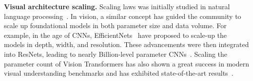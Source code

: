 \textbf{Visual architecture scaling.} Scaling laws was initially studied in natural language processing~\cite{scalinglaw}. In vision, a similar concept has guided the community to scale up foundational models in both parameter size and data volume. For example, in the age of CNNs, EfficientNets~\cite{efficientnet,efficientnetv2} have proposed to scale-up the models in depth, width, and  resolution. These advancements were then integrated into ResNets, leading to nearly Billion-level parameter CNNs~\cite{xie2020self,bigvit,gpipe,revisitresnet,resnettimm}. Scaling the parameter count of Vision Transformers has also shown a great success in modern visual understanding benchmarks and has exhibited state-of-the-art results~\cite{deepervit,deepvit,scalingvit,vit22b}.
